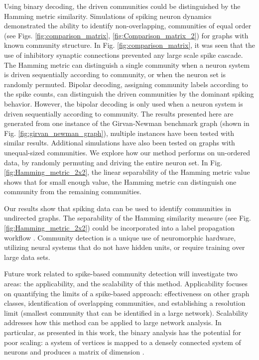 \documentclass[sigconf]{acmart}
\begin{document}
Using binary decoding, the driven communities could be distinguished by the Hamming metric similarity.  Simulations of spiking neuron dynamics demonstrated the ability to identify non-overlapping, communities of equal order (see Figs. \ref{fig:comparison_matrix}, \ref{fig:Comparison_matrix_2}) for graphs with known community structure. In Fig. \ref{fig:comparison_matrix}, it was seen that the use of inhibitory synaptic connections prevented any large scale spike cascade.  The Hamming metric can distinguish a single community when a neuron system is driven sequentially according to community, or when the neuron set is randomly permuted. Bipolar decoding, assigning community labels according to the spike counts, can distinguish the driven communities by the dominant spiking behavior. However, the bipolar decoding is only used when a neuron system is driven sequentially according to community. The results presented here are generated from one instance of the Girvan-Newman benchmark graph (shown in Fig. \ref{fig:girvan_newman_graph}), multiple instances have been tested with similar results. Additional simulations have also been tested on graphs with unequal-sized communities. We explore how our method performs on un-ordered data, by randomly permuting and driving the entire neuron set. In Fig. \ref{fig:Hamming_metric_2x2}, the linear separability of the Hamming metric value shows that for small enough  value, the Hamming metric can distinguish one community from the remaining  communities.

Our results show that spiking data can be used to identify communities in undirected graphs. The separability of the Hamming similarity measure (see Fig. \ref{fig:Hamming_metric_2x2}) could be incorporated into a label propagation workflow \cite{raghavan2007near,gallagher2008using,Peel2016relational}. Community detection is a unique use of neuromorphic hardware, utilizing neural systems that do not have hidden units, or require training over large data sets. 

Future work related to spike-based community detection will investigate two areas: the applicability, and the scalability of this method. Applicability focuses on quantifying the limits of a spike-based approach: effectiveness on other graph classes, identification of overlapping communities, and establishing a resolution limit (smallest community that can be identified in a large network). Scalability addresses how this method can be applied to large network analysis. In particular, as presented in this work, the binary analysis has the potential for poor scaling: a system of  vertices is mapped to a densely connected system of  neurons and produces a matrix of dimension . 






 

 
\end{document}
